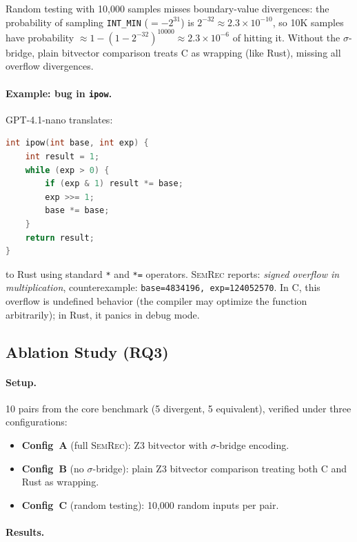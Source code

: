 \documentclass[11pt,a4paper]{article}
\begin{document}
Random testing with 10,000 samples misses boundary-value divergences:
the probability of sampling \texttt{INT\_MIN} ($= -2^{31}$) is
$2^{-32} \approx 2.3 \times 10^{-10}$, so 10K samples have probability
$\approx 1 - (1 - 2^{-32})^{10000} \approx 2.3 \times 10^{-6}$ of
hitting it.  Without the $\sigma$-bridge, plain bitvector comparison
treats C as wrapping (like Rust), missing all overflow divergences.

\paragraph{Example: bug in \texttt{ipow}.}
GPT-4.1-nano translates:
\begin{lstlisting}[language=C]
int ipow(int base, int exp) {
    int result = 1;
    while (exp > 0) {
        if (exp & 1) result *= base;
        exp >>= 1;
        base *= base;
    }
    return result;
}
\end{lstlisting}
to Rust using standard \texttt{*} and \texttt{*=} operators.
\textsc{SemRec} reports: \emph{signed overflow in multiplication},
counterexample: \texttt{base=4834196, exp=124052570}.  In C,
this overflow is undefined behavior (the compiler may optimize the
function arbitrarily); in Rust, it panics in debug mode.

\subsection{Ablation Study (RQ3)}\label{sec:eval-ablation}

\paragraph{Setup.} 10 pairs from the core benchmark (5 divergent,
5 equivalent), verified under three configurations:
\begin{itemize}
  \item \textbf{Config~A} (full \textsc{SemRec}): Z3 bitvector with
    $\sigma$-bridge encoding.
  \item \textbf{Config~B} (no $\sigma$-bridge): plain Z3 bitvector
    comparison treating both C and Rust as wrapping.
  \item \textbf{Config~C} (random testing): 10,000 random inputs per pair.
\end{itemize}

\paragraph{Results.}
\end{document}
